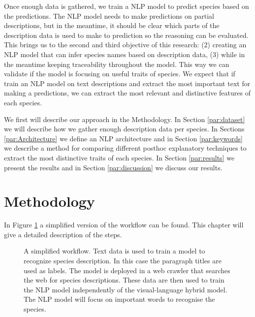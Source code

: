 \documentclass[a4paper, 12pt, oneside]{book} %
\begin{document}
Once enough data is gathered, we train a NLP model to predict species based on the predictions.
The NLP model needs to make predictions on partial descriptions, but in the meantime, it should be clear which parts of the description data is used to make to prediction so the reasoning can be evaluated. 
This brings us to the second and third objective of this research: (2) creating an NLP model that can infer species names based on description data, (3) while in the meantime keeping traceability throughout the model.
This way we can validate if the model is focusing on useful traits of species.
We expect that if train an NLP model on text descriptions and extract the most important text for making a predictions, we can extract the most relevant and distinctive features of each species.

We first will describe our approach in the Methodology.
In Section \ref{par:dataset} we will describe how we gather enough description data per species.
In Sections \ref{par:Architecture} we define an NLP architecture and in Section \ref{par:keywords} we describe a method for comparing different posthoc explanatory techniques to extract the most distinctive traits of each species.
In Section \ref{par:results} we present the results and in Section \ref{par:discussion} we discuss our results.

\newpage
\section{Methodology} \label{par:methodoly}
In Figure \ref{fig:workflow} a simplified version of the workflow can be found.
This chapter will give a detailed description of the steps.

\begin{figure} [htbp]
    \centering
    \caption[Workflow]{A simplified workflow. Text data is used to train a model to recognize species description. In this case the paragraph titles are used as labels. The model is deployed in a web crawler that searches the web for species descriptions. These data are then used to train the NLP model independently of the visual-language hybrid model. The NLP model will focus on important words to recognise the species.}
    \label{fig:workflow}
\end{figure}
\end{document}
